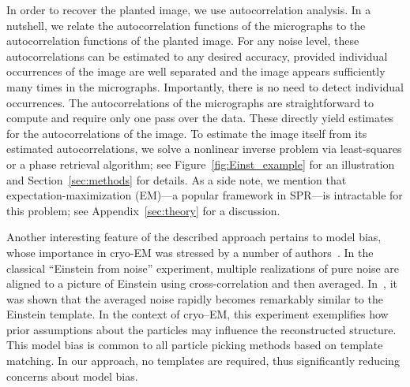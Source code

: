 \documentclass[english,11pt]{article}
\newcommand{\1}{\mathbf{1}}
\newcommand{\TODO}[1]{{\color{red}{[#1]}}}
\numberwithin{equation}{section}
\theoremstyle{plain}
\theoremstyle{definition}
\theoremstyle{remark}
\theoremstyle{plain}
\theoremstyle{remark}
\theoremstyle{plain}
\theoremstyle{plain}
\begin{document}
In order to recover the planted image, we use autocorrelation analysis. In a nutshell, we relate the autocorrelation functions of the micrographs to the autocorrelation functions of the planted image.
For any noise level, these autocorrelations can be estimated to any desired accuracy, provided individual occurrences of the image are well separated and the image appears sufficiently many times in the micrographs. Importantly, there is no need to detect individual occurrences. The autocorrelations of the micrographs are straightforward to compute and require only one pass over the data. These directly yield estimates for the autocorrelations of the image. To estimate the image itself from its estimated autocorrelations, we solve a nonlinear inverse problem via least-squares or a phase retrieval algorithm; see Figure~\ref{fig:Einst_example} for an illustration and Section~\ref{sec:methods} for details. As a side note, we mention that expectation-maximization (EM)---a popular framework in SPR---is intractable for this problem; see Appendix~\ref{sec:theory} for a discussion.

Another interesting feature of the described approach pertains to model bias, whose importance in cryo-EM was stressed by a number of authors~\cite{vanheel1992correlation,shatsky2009method,henderson2013avoiding,vanheel2013finding}. In the classical ``Einstein from noise'' experiment, multiple realizations of pure noise are aligned to a picture of Einstein using cross-correlation and then averaged. In~\cite{shatsky2009method}, it was shown that the averaged noise rapidly becomes remarkably similar to the Einstein template. In the context of cryo--EM, this experiment exemplifies how prior assumptions about the particles may influence the reconstructed structure. This model bias is common to all particle picking methods based on template matching. In our approach, no templates are required, thus significantly reducing concerns about model bias.







\end{document}
